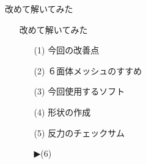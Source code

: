 \begin{frame}{改めて解いてみた}
  \begin{itemize}
      \item[] 改めて解いてみた
      \begin{itemize}[itemsep=1.3ex, leftmargin=1cm]
        \item[(1)]  {\color{cud_lightgray}今回の改善点}
        \item[(2)]  {\color{cud_lightgray}６面体メッシュのすすめ}
        \item[(3)]  {\color{cud_lightgray}今回使用するソフト}
        \item[(4)]  {\color{cud_lightgray}形状の作成}
        \item[(5)]  {\color{cud_lightgray}反力のチェックサム}
	\item[▶(6)]  
      \end{itemize}
  \end{itemize}
\end{frame}
